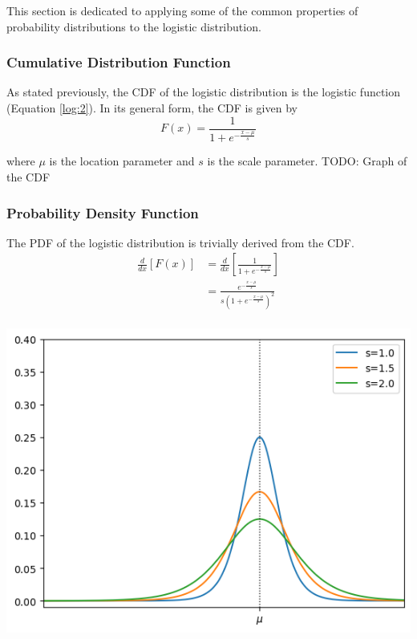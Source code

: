\documentclass[titlepage,12 pt]{article}
\begin{document}
This section is dedicated to applying some of the common properties of probability distributions to the logistic distribution.

\subsubsection{Cumulative Distribution Function}
As stated previously, the CDF of the logistic distribution is the logistic function (Equation \ref{log:2}).
In its general form, the CDF is given by
\[
   F(x) = \frac{1}{1 + e^{-\frac{x-\mu}{s}}}
\]

where $\mu$ is the location parameter and $s$ is the scale parameter.
TODO: Graph of the CDF

\subsubsection{Probability Density Function}

The PDF of the logistic distribution is trivially derived from the CDF.
\begin{align*}
    \frac{d}{dx} [F(x)] & = \frac{d}{dx} \left[\frac{1}{1 + e^{-\frac{x-\mu}{s}}}\right] \\
                      & = \frac{e^{-\frac{x-\mu}{s}}}{s(1 + e^{-\frac{x-\mu}{s}})^2} \\
\end{align*}

\begin{center}
\includegraphics[scale=0.6]{rendered/logistic_density.png}
\label{fig:logistic-density}
\end{center}
\end{document}
